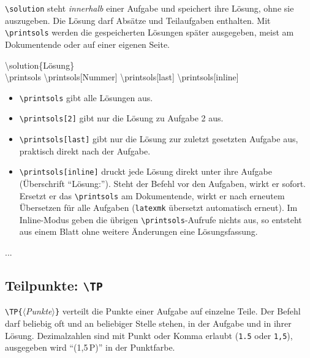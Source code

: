 \documentclass[a4paper,11pt,parskip=half]{scrartcl}
\newcommand{\cs}[1]{\texttt{\textbackslash #1}}
\newcommand{\marg}[1]{\texttt{\{}\meta{#1}\texttt{\}}}
\newcommand{\meta}[1]{\ensuremath{\langle}\textit{#1}\ensuremath{\rangle}}
\begin{document}
\cs{solution} steht \emph{innerhalb} einer Aufgabe und speichert ihre Lösung, ohne sie auszugeben.
Die Lösung darf Absätze und Teilaufgaben enthalten. Mit \cs{printsols} werden die gespeicherten
Lösungen später ausgegeben, meist am Dokumentende oder auf einer eigenen Seite.

\begin{befehl}{\textbackslash solution\{Lösung\} \\
\textbackslash printsols \quad \textbackslash printsols[Nummer] \quad \textbackslash printsols[last] \quad \textbackslash printsols[inline]}\end{befehl}

\begin{itemize}
  \item \cs{printsols} gibt alle Lösungen aus.
  \item \cs{printsols}\texttt{[2]} gibt nur die Lösung zu Aufgabe 2 aus.
  \item \cs{printsols}\texttt{[last]} gibt nur die Lösung zur zuletzt gesetzten Aufgabe aus,
        praktisch direkt nach der Aufgabe.
  \item \cs{printsols}\texttt{[inline]} druckt jede Lösung direkt unter ihre Aufgabe
        (Überschrift \enquote{Lösung:}). Steht der Befehl vor den Aufgaben, wirkt er sofort.
        Ersetzt er das \cs{printsols} am Dokumentende, wirkt er nach erneutem Übersetzen
        für alle Aufgaben (\texttt{latexmk} übersetzt automatisch erneut). Im Inline-Modus
        geben die übrigen \cs{printsols}-Aufrufe nichts aus, so entsteht aus einem Blatt
        ohne weitere Änderungen eine Lösungsfassung.
\end{itemize}

\begin{code}
\begin{Aufgabe}[2]
\end{Aufgabe}
...
\newpage
\printsols
\end{code}

\subsection{Teilpunkte: \cs{TP}}

\cs{TP}\marg{Punkte} verteilt die Punkte einer Aufgabe auf einzelne Teile. Der Befehl darf
beliebig oft und an beliebiger Stelle stehen, in der Aufgabe und in ihrer Lösung. Dezimalzahlen
sind mit Punkt oder Komma erlaubt (\texttt{1.5} oder \texttt{1,5}), ausgegeben wird
\enquote{(1,5\,P)} in der Punktfarbe.
\end{document}
